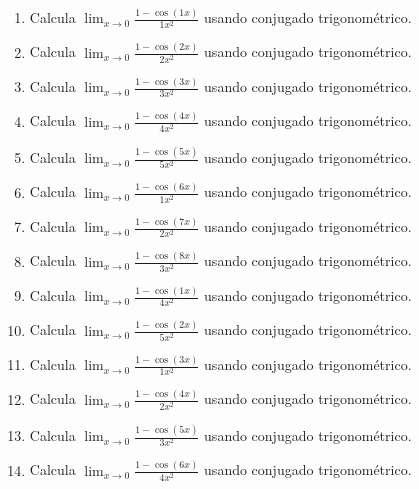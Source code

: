 \documentclass[11pt,a4paper]{article}
\begin{document}
\begin{enumerate}[label=\textbf{E\arabic*.},start=541]

\item Calcula $\displaystyle\lim_{x\to0}\frac{1-\cos(1x)}{1x^2}$ usando conjugado trigonométrico.

\item Calcula $\displaystyle\lim_{x\to0}\frac{1-\cos(2x)}{2x^2}$ usando conjugado trigonométrico.

\item Calcula $\displaystyle\lim_{x\to0}\frac{1-\cos(3x)}{3x^2}$ usando conjugado trigonométrico.

\item Calcula $\displaystyle\lim_{x\to0}\frac{1-\cos(4x)}{4x^2}$ usando conjugado trigonométrico.

\item Calcula $\displaystyle\lim_{x\to0}\frac{1-\cos(5x)}{5x^2}$ usando conjugado trigonométrico.

\item Calcula $\displaystyle\lim_{x\to0}\frac{1-\cos(6x)}{1x^2}$ usando conjugado trigonométrico.

\item Calcula $\displaystyle\lim_{x\to0}\frac{1-\cos(7x)}{2x^2}$ usando conjugado trigonométrico.

\item Calcula $\displaystyle\lim_{x\to0}\frac{1-\cos(8x)}{3x^2}$ usando conjugado trigonométrico.

\item Calcula $\displaystyle\lim_{x\to0}\frac{1-\cos(1x)}{4x^2}$ usando conjugado trigonométrico.

\item Calcula $\displaystyle\lim_{x\to0}\frac{1-\cos(2x)}{5x^2}$ usando conjugado trigonométrico.

\item Calcula $\displaystyle\lim_{x\to0}\frac{1-\cos(3x)}{1x^2}$ usando conjugado trigonométrico.

\item Calcula $\displaystyle\lim_{x\to0}\frac{1-\cos(4x)}{2x^2}$ usando conjugado trigonométrico.

\item Calcula $\displaystyle\lim_{x\to0}\frac{1-\cos(5x)}{3x^2}$ usando conjugado trigonométrico.

\item Calcula $\displaystyle\lim_{x\to0}\frac{1-\cos(6x)}{4x^2}$ usando conjugado trigonométrico.


\end{enumerate}
\end{document}
